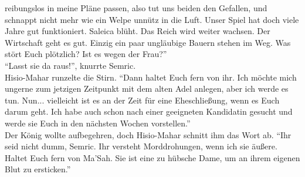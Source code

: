 reibungslos in meine Pläne passen, also tut uns beiden den Gefallen, und schnappt nicht mehr wie 
ein Welpe unnütz in die Luft. Unser Spiel hat doch viele Jahre gut funktioniert. Saleica blüht. Das 
Reich wird weiter wachsen. Der Wirtschaft geht es gut. Einzig ein paar ungläubige Bauern stehen im 
Weg. Was stört Euch plötzlich? Ist es wegen der Frau?''\\
``Lasst sie da raus!'', knurrte Semric.\\
Hisio-Mahar runzelte die Stirn. ``Dann haltet Euch fern von ihr. Ich möchte mich ungerne zum 
jetzigen Zeitpunkt mit dem alten Adel anlegen, aber ich werde es tun. Nun... vielleicht ist es an 
der Zeit für eine Eheschließung, wenn es Euch darum geht. Ich habe auch schon nach einer geeigneten 
Kandidatin gesucht und werde sie Euch in den nächsten Wochen vorstellen.''\\
Der König wollte aufbegehren, doch Hisio-Mahar schnitt ihm das Wort ab. ``Ihr seid nicht dumm, 
Semric. Ihr versteht Morddrohungen, wenn ich sie äußere. Haltet Euch fern von Ma'Sah. Sie ist eine 
zu hübsche Dame, um an ihrem eigenen Blut zu ersticken.''\\
